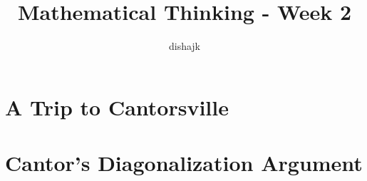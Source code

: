 \documentclass[12pt]{exam}
\title{Mathematical Thinking - Week 2}
\author{dishajk}
\begin{document}
\maketitle
\tableofcontents
\section{A Trip to Cantorsville}
\section{Cantor's Diagonalization Argument}
\begin{questions}
\question
\end{questions}
\end{document}
